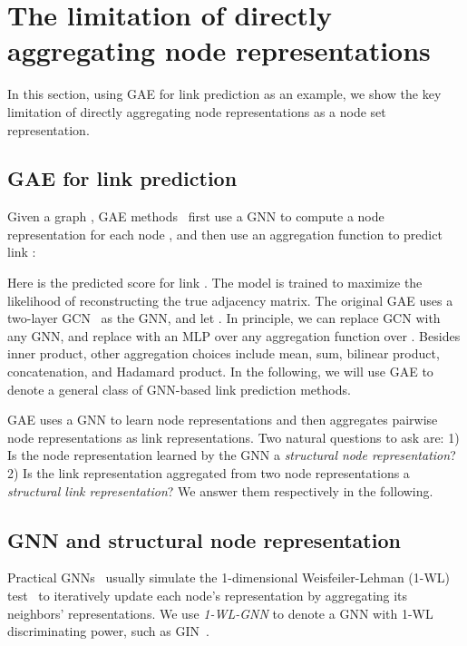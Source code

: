 \documentclass{article}
\begin{document}
\section{The limitation of directly aggregating node representations}
In this section, using GAE for link prediction as an example, we show the key limitation of directly aggregating node representations as a node set representation.



\setlength{\abovedisplayskip}{5pt}
\setlength{\belowdisplayskip}{5pt}

\subsection{GAE for link prediction}
Given a graph , GAE methods~\citep{kipf2016variational} first use a GNN to compute a node representation  for each node , and then use an aggregation function  to predict link :

Here  is the predicted score for link . The model is trained to maximize the likelihood of reconstructing the true adjacency matrix. The original GAE uses a two-layer GCN~\citep{kipf2016semi} as the GNN, and let . In principle, we can replace GCN with any GNN, and replace  with an MLP over any aggregation function over . Besides inner product, other aggregation choices include mean, sum, bilinear product, concatenation, and Hadamard product. In the following, we will use GAE to denote a general class of GNN-based link prediction methods. 

GAE uses a GNN to learn node representations and then aggregates pairwise node representations as link representations. Two natural questions to ask are: 1) Is the node representation learned by the GNN a \textit{structural node representation}? 2) Is the link representation aggregated from two node representations a \textit{structural link representation}? We answer them respectively in the following.


\subsection{GNN and structural node representation}
Practical GNNs~\citep{gilmer2017neural} usually simulate the 1-dimensional Weisfeiler-Lehman (1-WL) test~\citep{weisfeiler1968reduction} to iteratively update each node's representation by aggregating its neighbors' representations. We use \textit{1-WL-GNN} to denote a GNN with 1-WL discriminating power, such as GIN~\citep{xu2018powerful}.
\end{document}
